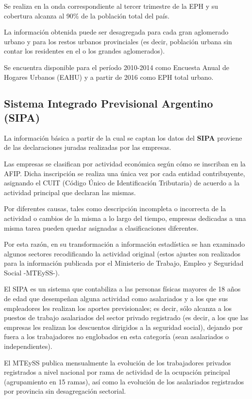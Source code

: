 \documentclass[
  openany]{book}
\begin{document}
Se realiza en la onda correspondiente al tercer trimestre de la EPH y su cobertura alcanza al 90\% de la población total del país.

La información obtenida puede ser desagregada para cada gran aglomerado urbano y para los restos urbanos provinciales (es decir, población urbana sin contar los residentes en el o los grandes aglomerados).

Se encuentra disponible para el período 2010-2014 como Encuesta Anual de Hogares Urbanos (EAHU) y a partir de 2016 como EPH total urbano.

\hypertarget{sistema-integrado-previsional-argentino-sipa}{%
\subsection{Sistema Integrado Previsional Argentino (SIPA)}\label{sistema-integrado-previsional-argentino-sipa}}

La información básica a partir de la cual se captan los datos del \textbf{SIPA} proviene de las declaraciones juradas realizadas por las empresas.

Las empresas se clasifican por actividad económica según cómo se inscriban en la AFIP.
Dicha inscripción se realiza una única vez por cada entidad contribuyente, asignando el CUIT (Código Único de Identificación Tributaria) de acuerdo a la actividad principal que declaran las mismas.

Por diferentes causas, tales como descripción incompleta o incorrecta de la actividad o cambios de la misma a lo largo del tiempo, empresas dedicadas a una misma tarea pueden quedar asignadas a clasificaciones diferentes.

Por esta razón, en su transformación a información estadística se han examinado algunos sectores recodificando la actividad original (estos ajustes son realizados para la información publicada por el Ministerio de Trabajo, Empleo y Seguridad Social -MTEySS-).

El SIPA es un sistema que contabiliza a las personas físicas mayores de 18 años de edad que desempeñan alguna actividad como asalariados y a los que sus empleadores les realizan los aportes previsionales; es decir, sólo alcanza a los puestos de trabajo asalariados del sector privado registrado (es decir, a los que las empresas les realizan los descuentos dirigidos a la seguridad social), dejando por fuera a los trabajadores no englobados en esta categoría (sean asalariados o independientes).

El MTEySS publica mensualmente la evolución de los trabajadores privados registrados a nivel nacional por rama de actividad de la ocupación principal (agrupamiento en 15 ramas), así como la evolución de los asalariados registrados por provincia sin desagregación sectorial.
\end{document}
